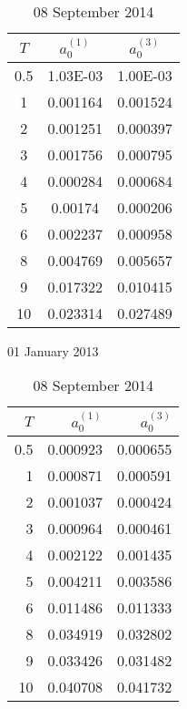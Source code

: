 \documentclass[12pt,a4paper]{article}
\theoremstyle{plain}
\numberwithin{equation}{section}
\begin{document}
\begin{table}[t]
\centering
\begin{subtable}{.4\textwidth}
\centering
    \begin{tabular}{|ccc|}
     \hline
    $T$     & $a_0^{(1)}$ & $a_0^{(3)}$ \\
     \hline
    0.5   & 1.03E-03 & 1.00E-03 \\
    1     & 0.001164 & 0.001524 \\
    2     & 0.001251 & 0.000397 \\
    3     & 0.001756 & 0.000795 \\
    4     & 0.000284 & 0.000684 \\
    5     & 0.00174 & 0.000206 \\
    6     & 0.002237 & 0.000958 \\
    8     & 0.004769 & 0.005657 \\
    9     & 0.017322 & 0.010415 \\
    10    & 0.023314 & 0.027489 \\
    \bottomrule
    \end{tabular}
\caption{01 January 2013}
\end{subtable}%
\begin{subtable}{.4\textwidth}
\centering
    \begin{tabular}{|rrr|}
     \hline
    $T$ &$a_0^{(1)}$ & $a_0^{(3)}$ \\
   \hline

    0.5   & 0.000923 & 0.000655 \\
    1     & 0.000871 & 0.000591 \\
    2     & 0.001037 & 0.000424 \\
    3     & 0.000964 & 0.000461 \\
    4     & 0.002122 & 0.001435 \\
    5     & 0.004211 & 0.003586 \\
    6     & 0.011486 & 0.011333 \\
    8     & 0.034919 & 0.032802 \\
    9     & 0.033426 & 0.031482 \\
    10    & 0.040708 & 0.041732 \\
     \hline
    \end{tabular}
\caption{08 September 2014}
\end{subtable}\vspace*{1.5em}


\end{table}
\end{document}
